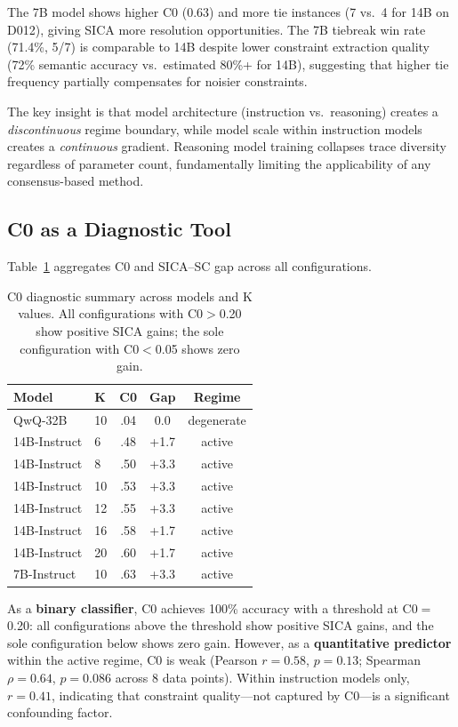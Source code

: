 \documentclass[11pt,a4paper]{article}
\begin{document}
The 7B model shows higher C0 (0.63) and more tie instances (7 vs.\ 4 for 14B on D012), giving SICA more resolution opportunities. The 7B tiebreak win rate (71.4\%, 5/7) is comparable to 14B despite lower constraint extraction quality (72\% semantic accuracy vs.\ estimated 80\%+ for 14B), suggesting that higher tie frequency partially compensates for noisier constraints.

The key insight is that model architecture (instruction vs.\ reasoning) creates a \emph{discontinuous} regime boundary, while model scale within instruction models creates a \emph{continuous} gradient. Reasoning model training collapses trace diversity regardless of parameter count, fundamentally limiting the applicability of any consensus-based method.

\subsection{C0 as a Diagnostic Tool}
\label{sec:c0}

Table~\ref{tab:c0_diagnostic} aggregates C0 and SICA--SC gap across all configurations.

\begin{table}[t]
\centering
\small
\begin{tabular}{llccc}
\toprule
\textbf{Model} & \textbf{K} & \textbf{C0} & \textbf{Gap} & \textbf{Regime} \\
\midrule
QwQ-32B       & 10 & .04  & 0.0  & degenerate \\
14B-Instruct  & 6  & .48  & +1.7 & active \\
14B-Instruct  & 8  & .50  & +3.3 & active \\
14B-Instruct  & 10 & .53  & +3.3 & active \\
14B-Instruct  & 12 & .55  & +3.3 & active \\
14B-Instruct  & 16 & .58  & +1.7 & active \\
14B-Instruct  & 20 & .60  & +1.7 & active \\
7B-Instruct   & 10 & .63  & +3.3 & active \\
\bottomrule
\end{tabular}
\caption{C0 diagnostic summary across models and K values. All configurations with C0$>$0.20 show positive SICA gains; the sole configuration with C0$<$0.05 shows zero gain.}
\label{tab:c0_diagnostic}
\end{table}

As a \textbf{binary classifier}, C0 achieves 100\% accuracy with a threshold at C0$=$0.20: all configurations above the threshold show positive SICA gains, and the sole configuration below shows zero gain. However, as a \textbf{quantitative predictor} within the active regime, C0 is weak (Pearson $r{=}0.58$, $p{=}0.13$; Spearman $\rho{=}0.64$, $p{=}0.086$ across 8 data points). Within instruction models only, $r{=}0.41$, indicating that constraint quality---not captured by C0---is a significant confounding factor.
\end{document}
